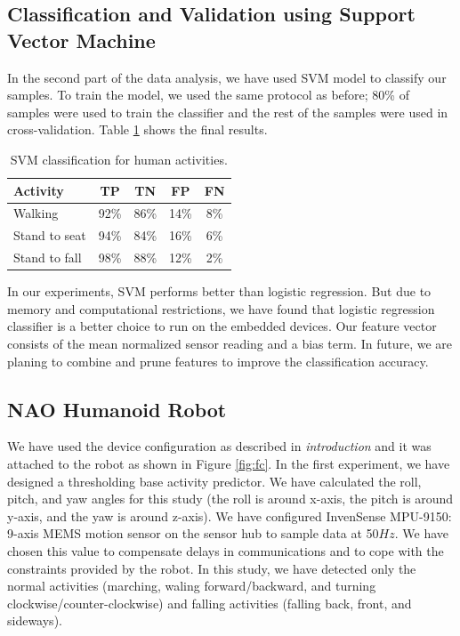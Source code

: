 \documentclass[letterpaper]{article}
\begin{document}
\subsection{Classification and Validation using Support Vector Machine}

In the second part of the data analysis, we have used SVM model
to classify our samples. To train the model, we used the same protocol as before; 80\% of
samples were used to train  the classifier and the rest of the  samples were used in 
cross-validation. Table \ref{tab:human-svm-class} shows the final results.




\begin{table}[!ht]
\caption{SVM classification for human activities.}
	\label{tab:human-svm-class}
	\centering
		\begin{tabular} {|l |c |c |c|c|}
			\hline
			{\bf Activity} & {\bf  TP}  &	{\bf TN}  &	{\bf FP} &	{\bf FN} \\ 
			\hline
			Walking	& 92\%	& 86\%	& 14\%	& 8\% \\ \hline
			Stand to seat	& 94\%	& 84\%	& 16\% & 	6\%	 \\ \hline 
			Stand to fall	& 98\%	& 88\%	& 12\%	& 2\%	 \\ \hline
		\end{tabular}
\end{table}

 In our experiments, SVM performs better than logistic regression. But due to 
memory and computational restrictions, we have found that logistic regression classifier is a 
better choice to run on the embedded devices. Our feature vector consists of the mean normalized 
sensor reading and a bias term. In future, we are planing to  combine and prune features 
to improve the classification accuracy.  


\subsection{NAO Humanoid Robot}


We have used the device configuration as described  in {\em introduction} 
and it was attached to the robot as shown in Figure \ref{fig:fc}. In the first experiment, we have 
designed a thresholding base activity  predictor. We have calculated the roll, pitch, and yaw angles 
for this study (the roll is around x-axis, the pitch is around y-axis, and the yaw is around 
z-axis). We have configured InvenSense MPU-9150: 9-axis MEMS motion sensor on the sensor hub to 
sample data at 50$Hz$. We have chosen this value to compensate delays in communications and to cope 
with the constraints provided by the robot. In this study, we have detected only the normal 
activities (marching, waling forward/backward, and turning clockwise/counter-clockwise)
and falling activities (falling back, front, and sideways).
\end{document}
